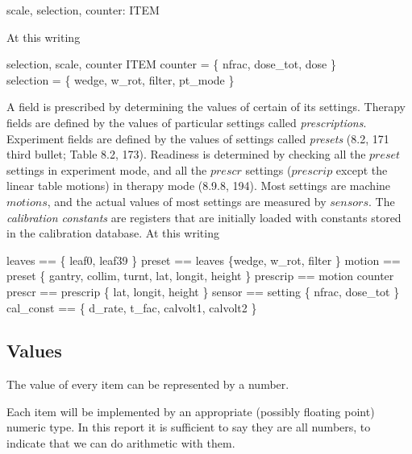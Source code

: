 \documentclass{article}
\begin{document}
\begin{axdef}
	scale, selection, counter: \power ITEM
\end{axdef}
At this writing

\begin{zed}
	\langle selection, scale, counter \rangle \partition ITEM
\also
	counter = \{ nfrac, dose\_tot, dose \} \\
	selection = \{ wedge, w\_rot, filter, pt\_mode \} \\
\end{zed}
A field is prescribed by determining the values of certain of its
settings.  Therapy fields are defined by the values of particular
settings called {\em prescriptions}.  Experiment fields are defined by
the values of settings called {\em presets} (8.2, 171 third bullet;
Table 8.2, 173).  Readiness is determined by checking all the $preset$
settings in experiment mode, and all the $prescr$ settings ($prescrip$
except the linear table motions) in therapy mode (8.9.8, 194).
Most settings are machine $motions$, and the actual values of most
settings are measured by $sensors$.  The {\em calibration constants}
are registers that are initially loaded with constants stored in the
calibration database.  At this writing



\begin{zed}
	leaves == \{ leaf0, leaf39 \}
\also
	preset == leaves \cup \{wedge, w\_rot, filter \}
\also
	motion == preset \cup \{ gantry, collim, turnt, lat, longit, height \}
\also
	prescrip == motion \cup counter 
\also
	prescr == prescrip \setminus \{ lat, longit, height \}
\also
	sensor == setting \setminus \{ nfrac, dose\_tot \}
\also
	cal\_const == \{ d\_rate, t\_fac, calvolt1, calvolt2 \}
\end{zed}

\subsection{Values} \label{sect:values}

The value of every item can be represented by a number.

Each item will be implemented by an appropriate
(possibly floating point) numeric type.  In this report it is
sufficient to say they are all numbers, to indicate that we can
do arithmetic with them.
\end{document}
